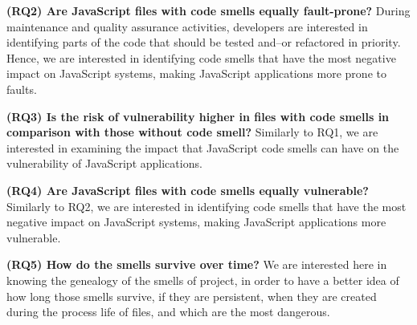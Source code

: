 \textbf{(RQ2) Are JavaScript files with code smells equally fault-prone?}
During maintenance and quality assurance activities, developers are interested in identifying parts of the code that should be tested and--or refactored in priority. Hence, we are interested in identifying code smells that have the most negative impact on JavaScript systems, \ie{} making JavaScript applications more prone to faults.

{\color{blue}\textbf{(RQ3) Is the risk of vulnerability higher in files with code smells in comparison with those without code smell?}
Similarly to RQ1, we are interested in examining the impact that JavaScript code smells can have on the vulnerability of JavaScript applications.
	
\textbf{(RQ4) Are JavaScript files with code smells equally vulnerable?}
Similarly to RQ2, we are interested in identifying code smells that have the most negative impact on JavaScript systems, \ie{} making JavaScript applications more vulnerable.
	
\textbf{(RQ5) How do the smells survive over time?}
We are interested here in knowing the genealogy of the smells of project, in order to have a better idea of how long those smells survive, if they are persistent, when they are created during the process life of files, and which are the most dangerous.
}

